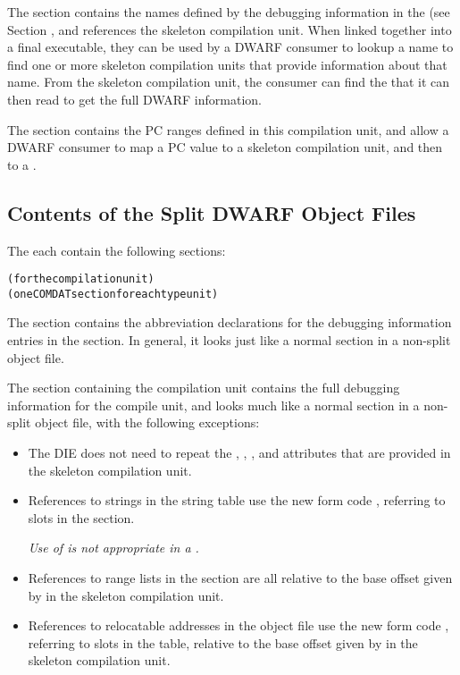 The \dotdebugnames{}
section contains the names defined by the debugging
information in the \splitDWARFobjectfile{} 
(see Section , 
and references the skeleton compilation unit. 
When linked together into a final executable,
they can be used by a DWARF consumer to lookup a name to find one
or more skeleton compilation units that provide information about
that name. From the skeleton compilation unit, the consumer can
find the \splitDWARFobjectfile{} that it can then read to get the full
DWARF information.

The \dotdebugaranges{} section contains the PC ranges defined in this
compilation unit, and allow a DWARF consumer to map a PC value to
a skeleton compilation unit, and then to a \splitDWARFobjectfile.


\subsection{Contents of the Split DWARF Object Files}
The  each contain the following sections:
\begin{alltt}
  \dotdebugabbrevdwo
  \dotdebuginfodwo{} (for the compilation unit)
  \dotdebuginfodwo{} (one COMDAT section for each type unit)
  \dotdebuglocdwo
  \dotdebuglinedwo
  \dotdebugmacrodwo
  \dotdebugstroffsetsdwo
  \dotdebugstrdwo
\end{alltt}
The \dotdebugabbrevdwo{} section contains the abbreviation
declarations for the debugging information entries in the
\dotdebuginfodwo{} section. In general, it looks just like a normal
\dotdebugabbrev{} section in a non-split object file.

The \dotdebuginfodwo{} section containing the compilation unit
contains the full debugging information for the compile unit, and
looks much like a normal \dotdebuginfo{} section in a non-split
object file, with the following exceptions:
\begin{itemize}
\item The \DWTAGcompileunit{} DIE does not need to repeat the
\DWATranges, \DWATlowpc, \DWAThighpc, and
\DWATstmtlist{} attributes that are provided in the skeleton
compilation unit.

\item References to strings in the string table use the new form
code \DWFORMstrx, referring to slots in the
\dotdebugstroffsetsdwo{} section.

\textit{Use of \DWFORMstrp{} is not appropriate in a \splitDWARFobjectfile.}

\item References to range lists in the \dotdebugranges{} section are
all relative to the base offset given by \DWATrangesbase{}
in the skeleton compilation unit.

\item References to relocatable addresses in the object file use
the new form code \DWFORMaddrx, referring to slots in the
\dotdebugaddr{} table, relative to the base offset given by
\DWATaddrbase{} in the skeleton compilation unit.
\end{itemize}

